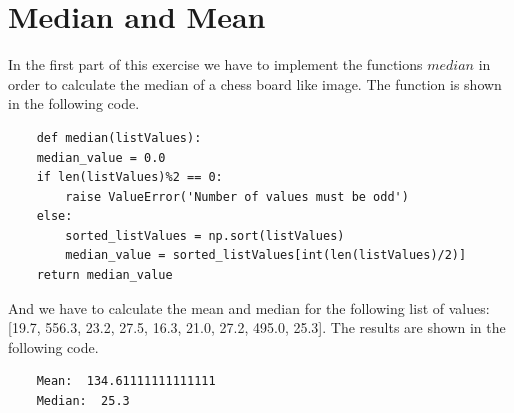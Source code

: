\documentclass[12pt
,headinclude
,headsepline
,bibtotocnumbered
]{scrartcl}
\begin{document}
\section{Median and Mean}
In the first part of this exercise we have to implement the functions $median$ in order to calculate the median of a chess board like image. The function is shown in the following code.
\begin{lstlisting}
    def median(listValues):
    median_value = 0.0
    if len(listValues)%2 == 0:
        raise ValueError('Number of values must be odd')
    else:
        sorted_listValues = np.sort(listValues)
        median_value = sorted_listValues[int(len(listValues)/2)]
    return median_value
\end{lstlisting}
And we have to calculate the mean and median for the following list of values: [19.7, 556.3, 23.2, 27.5, 16.3, 21.0, 27.2, 495.0, 25.3]. The results are shown in the following code.
\begin{verbatim}
    Mean:  134.61111111111111
    Median:  25.3
\end{verbatim}
\end{document}
